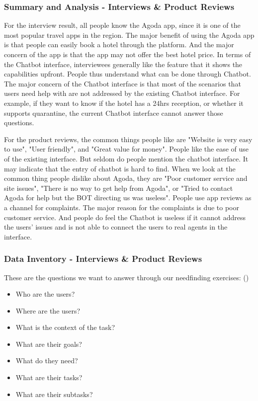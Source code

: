 \documentclass[
	letterpaper, %
]{jdf}
\begin{document}
\subsubsection{Summary and Analysis - Interviews \& Product Reviews}
For the interview result, all people know the Agoda app, since it is one of the most popular travel apps in the region. The major benefit of using the Agoda app is that people can easily book a hotel through the platform. And the major concern of the app is that the app may not offer the best hotel price. In terms of the Chatbot interface, interviewees generally like the feature that it shows the capabilities upfront. People thus understand what can be done through Chatbot. The major concern of the Chatbot interface is that most of the scenarios that users need help with are not addressed by the existing Chatbot interface. For example, if they want to know if the hotel has a 24hrs reception, or whether it supports quarantine, the current Chatbot interface cannot answer those questions.

For the product reviews, the common things people like are "Website is very easy to use", "User friendly", and "Great value for money". People like the ease of use of the existing interface. But seldom do people mention the chatbot interface. It may indicate that the entry of chatbot is hard to find. When we look at the common thing people dislike about Agoda, they are "Poor customer service and site issues", "There is no way to get help from Agoda", or "Tried to contact Agoda for help but the BOT directing us was useless". People use app reviews as a channel for complaints. The major reason for the complaints is due to poor customer service. And people do feel the Chatbot is useless if it cannot address the users' issues and is not able to connect the users to real agents in the interface.

\subsubsection{Data Inventory - Interviews \& Product Reviews}
These are the questions we want to answer through our needfinding exercises: (\cite{joyner2016d})
\begin{itemize}
    \item Who are the users?
    \item Where are the users?
    \item What is the context of the task?
    \item What are their goals?
    \item What do they need?
    \item What are their tasks?
    \item What are their subtasks?
\end{itemize}
\end{document}
